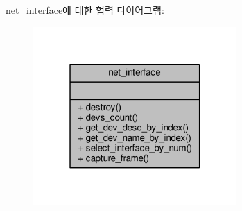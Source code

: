 net\+\_\+interface에 대한 협력 다이어그램\+:
\nopagebreak
\begin{figure}[H]
\begin{center}
\leavevmode
\includegraphics[width=220pt]{classavdecc__lib_1_1net__interface__coll__graph}
\end{center}
\end{figure}
